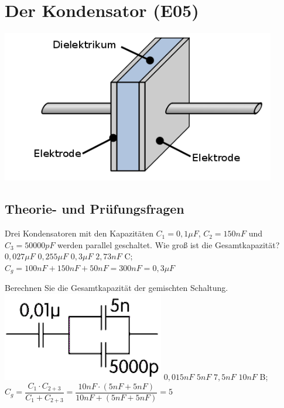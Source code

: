 \graphicspath{{e05_Kondensator/}}

\clearpage
\begin{minipage}{0.8\textwidth}
  \chapter{Der Kondensator (E05)}
\end{minipage}
\begin{minipage}{0.2\textwidth}
  \includegraphics[width=0.9\textwidth]{Kondensator.png}
  \footnotemark
\end{minipage}


\section{Theorie- und Prüfungsfragen}

{
Drei Kondensatoren mit den Kapazitäten $C_1 = 0,1\mu F$, $C_2 = 150nF$ und $C_3 = 50000pF$ werden parallel geschaltet. Wie groß ist die Gesamtkapazität?
}%
{$0,027\mu F$}%
{$0,255\mu F$}%
{$0,3\mu F$}%
{$2,73nF$}%
{C; $C_g = 100nF + 150nF + 50nF = 300nF = 0,3\mu F$}%


{
Berechnen Sie die Gesamtkapazität der gemischten Schaltung.\\
\includegraphics[scale=0.35]{TD105.png}
}%
{$0,015nF$}%
{$5nF$}%
{$7,5nF$}%
{$10nF$}%
{B; $C_g = \dfrac{C_1 \cdot C_{2+3}}{C_1 + C_{2+3}} = \dfrac{10nF \cdot (5nF + 5nF)}{10nF + (5nF + 5nF)} = 5$}%

